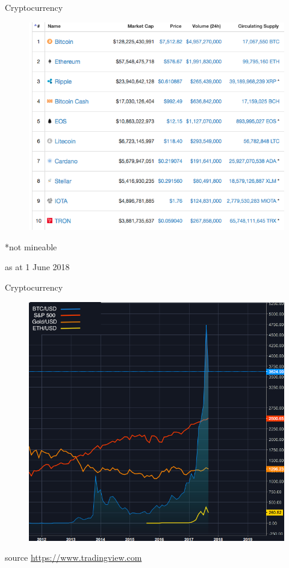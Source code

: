 \documentclass[11pt]{beamer}
\begin{document}

\begin{frame}{Cryptocurrency}
	\begin{figure}[]
		\centering
		\includegraphics  [scale=0.3]{Images/markcap}
	\end{figure}
	*not mineable\\
	\begin{tiny}
		as at 1 June 2018
	\end{tiny}
\end{frame}



\begin{frame}{Cryptocurrency}
	\begin{figure}[]
		\centering
		\includegraphics  [width=3.in]{Images/price}
	\end{figure}
	\begin{scriptsize}
		source \href{https://www.tradingview.com}{https://www.tradingview.com}
	\end{scriptsize}
\end{frame}
\end{document}
